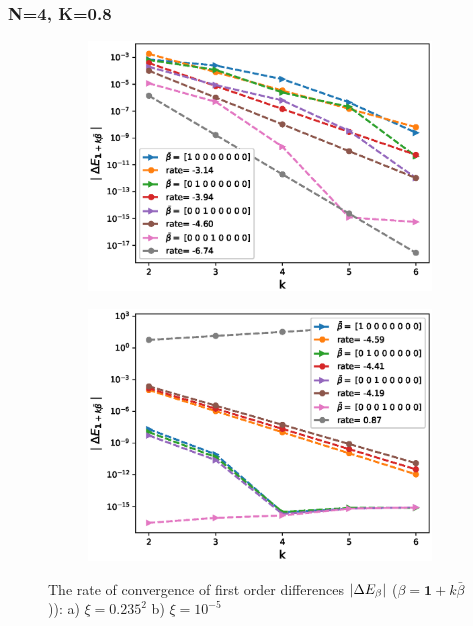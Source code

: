 \documentclass[11pt]{article}
\begin{document}
\newpage
\subsubsection*{N=4, K=0.8 }
\begin{figure}[h!]
\centering
\begin{subfigure}{.5\textwidth}
\centering
\includegraphics[width=1\linewidth]{./figures/effect_rho_differences/H_0_43_K_0_8/N_4/first_difference_rbergomi_4steps_H_043_K_0_8_rho__0_9_with_rate_W1.eps}
\caption{}
\label{fig:sub3}
\end{subfigure}%
\begin{subfigure}{.5\textwidth}
\centering
\includegraphics[width=1\linewidth]{./figures/effect_xi_differences/H_0_43_K_0_8/N_4/first_difference_rbergomi_4steps_H_043_K_0_8_xi_10__5_with_rate_W1.eps}
\caption{}
\label{fig:sub4}
\end{subfigure}

\caption{The rate of convergence of  first order differences $\left\lvert\Delta E_{\beta}\right\rvert$ ($\beta=\mathbf{1}+k \bar{\beta}$)): a) $\xi=0.235^2$ b)  $\xi=10^{-5}$}
\label{fig:test2}
\end{figure}
\end{document}
